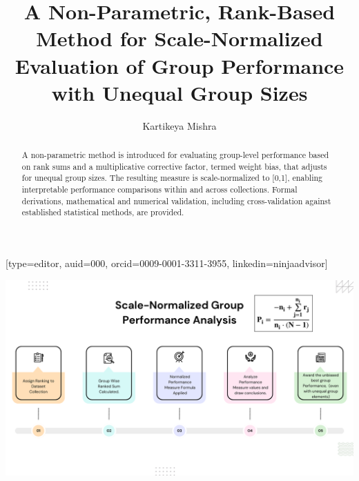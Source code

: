 \documentclass[a4paper,fleqn,review]{cas-sc}
\begin{document}
\let\WriteBookmarks\relax
\def\floatpagepagefraction{1}
\def\textpagefraction{.001}


\title [mode = title]{A Non-Parametric, Rank-Based Method for Scale-Normalized Evaluation of Group Performance with Unequal Group Sizes}            
\tnotemark[1]


\author[1]{Kartikeya Mishra}[type=editor,
auid=000,
orcid=0009-0001-3311-3955,
linkedin=ninjaadvisor]



\credit{}

\begin{abstract}
	 A non-parametric method is introduced for evaluating group-level performance based on rank sums and a multiplicative corrective factor, termed weight bias, that adjusts for unequal group sizes. The resulting measure is scale-normalized to [0,1], enabling interpretable performance comparisons within and across collections. Formal derivations, mathematical and numerical validation, including cross-validation against established statistical methods, are provided.
\end{abstract}

\begin{graphicalabstract}
	\centering
	\includegraphics[scale=0.33]{Graphical-Abstract-for-Group-Performance-Analysis}
\end{graphicalabstract}
\end{document}
